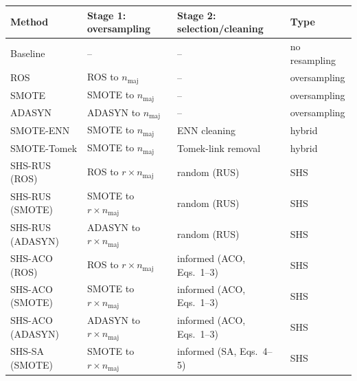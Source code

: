 \begin{tabular}{llll}
\toprule
Method & Stage 1: oversampling & Stage 2: selection/cleaning & Type \\
\midrule
Baseline & -- & -- & no resampling \\
ROS & ROS to $n_{\mathrm{maj}}$ & -- & oversampling \\
SMOTE & SMOTE to $n_{\mathrm{maj}}$ & -- & oversampling \\
ADASYN & ADASYN to $n_{\mathrm{maj}}$ & -- & oversampling \\
SMOTE-ENN & SMOTE to $n_{\mathrm{maj}}$ & ENN cleaning & hybrid \\
SMOTE-Tomek & SMOTE to $n_{\mathrm{maj}}$ & Tomek-link removal & hybrid \\
SHS-RUS (ROS) & ROS to $r \times n_{\mathrm{maj}}$ & random (RUS) & SHS \\
SHS-RUS (SMOTE) & SMOTE to $r \times n_{\mathrm{maj}}$ & random (RUS) & SHS \\
SHS-RUS (ADASYN) & ADASYN to $r \times n_{\mathrm{maj}}$ & random (RUS) & SHS \\
SHS-ACO (ROS) & ROS to $r \times n_{\mathrm{maj}}$ & informed (ACO, Eqs.~1--3) & SHS \\
SHS-ACO (SMOTE) & SMOTE to $r \times n_{\mathrm{maj}}$ & informed (ACO, Eqs.~1--3) & SHS \\
SHS-ACO (ADASYN) & ADASYN to $r \times n_{\mathrm{maj}}$ & informed (ACO, Eqs.~1--3) & SHS \\
SHS-SA (SMOTE) & SMOTE to $r \times n_{\mathrm{maj}}$ & informed (SA, Eqs.~4--5) & SHS \\
\bottomrule
\end{tabular}
